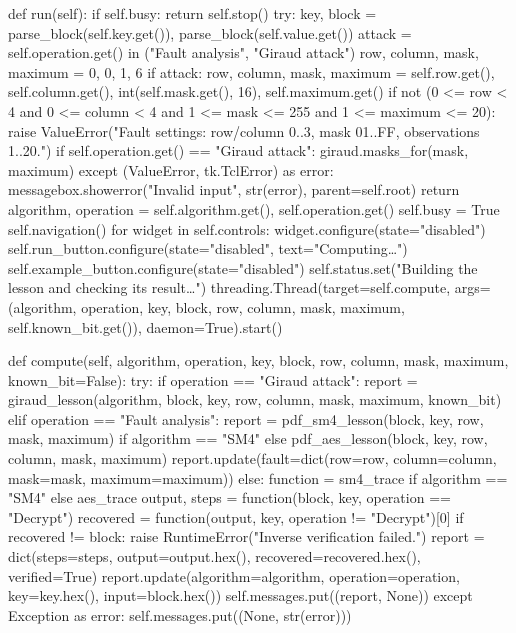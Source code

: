 \begin{lightcode}[numbers=left,firstnumber=1]
    def run(self):
        if self.busy:
            return
        self.stop()
        try:
            key, block = parse_block(self.key.get()), parse_block(self.value.get())
            attack = self.operation.get() in ("Fault analysis", "Giraud attack")
            row, column, mask, maximum = 0, 0, 1, 6
            if attack:
                row, column, mask, maximum = self.row.get(), self.column.get(), int(self.mask.get(), 16), self.maximum.get()
                if not (0 <= row < 4 and 0 <= column < 4 and 1 <= mask <= 255 and 1 <= maximum <= 20):
                    raise ValueError("Fault settings: row/column 0..3, mask 01..FF, observations 1..20.")
                if self.operation.get() == "Giraud attack":
                    giraud.masks_for(mask, maximum)
        except (ValueError, tk.TclError) as error:
            messagebox.showerror("Invalid input", str(error), parent=self.root)
            return
        algorithm, operation = self.algorithm.get(), self.operation.get()
        self.busy = True
        self.navigation()
        for widget in self.controls:
            widget.configure(state="disabled")
        self.run_button.configure(state="disabled", text="Computing…")
        self.example_button.configure(state="disabled")
        self.status.set("Building the lesson and checking its result…")
        threading.Thread(target=self.compute, args=(algorithm, operation, key, block, row, column, mask, maximum, self.known_bit.get()), daemon=True).start()

    def compute(self, algorithm, operation, key, block, row, column, mask, maximum, known_bit=False):
        try:
            if operation == "Giraud attack":
                report = giraud_lesson(algorithm, block, key, row, column, mask, maximum, known_bit)
            elif operation == "Fault analysis":
                report = pdf_sm4_lesson(block, key, row, mask, maximum) if algorithm == "SM4" else pdf_aes_lesson(block, key, row, column, mask, maximum)
                report.update(fault=dict(row=row, column=column, mask=mask, maximum=maximum))
            else:
                function = sm4_trace if algorithm == "SM4" else aes_trace
                output, steps = function(block, key, operation == "Decrypt")
                recovered = function(output, key, operation != "Decrypt")[0]
                if recovered != block:
                    raise RuntimeError("Inverse verification failed.")
                report = dict(steps=steps, output=output.hex(), recovered=recovered.hex(), verified=True)
            report.update(algorithm=algorithm, operation=operation, key=key.hex(), input=block.hex())
            self.messages.put((report, None))
        except Exception as error:
            self.messages.put((None, str(error)))


\end{lightcode}
